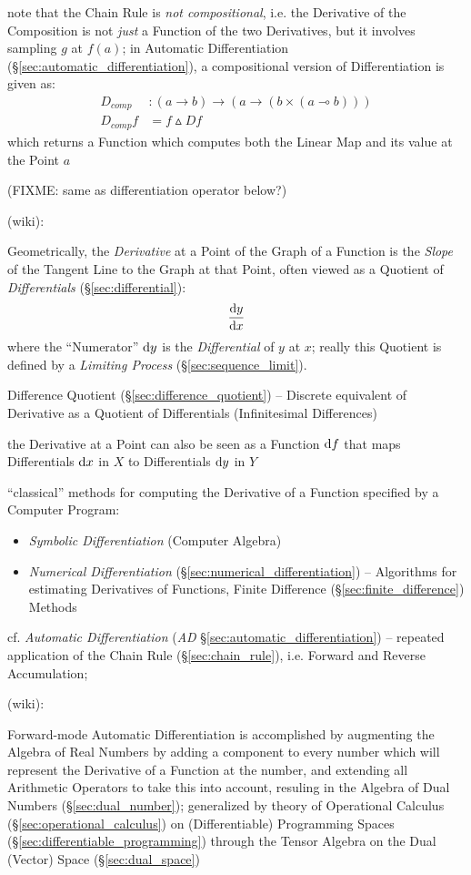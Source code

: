 note that the Chain Rule is \emph{not compositional}, i.e. the Derivative of the
Composition is not \emph{just} a Function of the two Derivatives, but it
involves sampling $g$ at $f(a)$; in Automatic Differentiation
(\S\ref{sec:automatic_differentiation}), a compositional version of
Differentiation is given as:
\begin{align*}
  D_{comp}   & : (a \rightarrow b)
    \rightarrow (a \rightarrow (b \times (a \multimap b))) \\
  D_{comp} f & = f \vartriangle D f
\end{align*}
which returns a Function which computes both the Linear Map and its value at the
Point $a$

(FIXME: same as differentiation operator below?)

(wiki):

Geometrically, the \emph{Derivative} at a Point of the Graph of a Function is
the \emph{Slope} of the Tangent Line to the Graph at that Point, often viewed as
a Quotient of \emph{Differentials} (\S\ref{sec:differential}):
\[
  \frac{\mathrm{d}y}{\mathrm{d}x}
\]
where the ``Numerator'' $\mathrm{d}y$ is the \emph{Differential} of $y$ at $x$;
really this Quotient is defined by a \emph{Limiting Process}
(\S\ref{sec:sequence_limit}). %

\fist Difference Quotient (\S\ref{sec:difference_quotient}) -- Discrete
equivalent of Derivative as a Quotient of Differentials (Infinitesimal
Differences)

the Derivative at a Point can also be seen as a Function $\mathrm{d}f$ that maps
Differentials $\mathrm{d}x$ in $X$ to Differentials $\mathrm{d}y$ in $Y$

``classical'' methods for computing the Derivative of a Function specified by a
Computer Program:
\begin{itemize}
\item \emph{Symbolic Differentiation} (Computer Algebra)
\item \emph{Numerical Differentiation} (\S\ref{sec:numerical_differentiation})
  -- Algorithms for estimating Derivatives of Functions, Finite Difference
  (\S\ref{sec:finite_difference}) Methods
\end{itemize}

\fist cf. \emph{Automatic Differentiation} (\emph{AD}
\S\ref{sec:automatic_differentiation}) -- repeated application of the Chain Rule
(\S\ref{sec:chain_rule}), i.e. Forward and Reverse Accumulation;

(wiki):

Forward-mode Automatic Differentiation is accomplished by augmenting the Algebra
of Real Numbers by adding a component to every number which will represent the
Derivative of a Function at the number, and extending all Arithmetic Operators
to take this into account, resuling in the Algebra of Dual Numbers
(\S\ref{sec:dual_number}); generalized by theory of
Operational Calculus (\S\ref{sec:operational_calculus}) on (Differentiable)
Programming Spaces (\S\ref{sec:differentiable_programming}) through the Tensor
Algebra on the Dual (Vector) Space (\S\ref{sec:dual_space})


